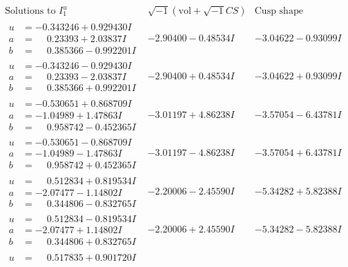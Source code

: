 \documentclass[1p]{elsarticle_modified}
\theoremstyle{definition}
\newcommand{\I}{\sqrt{-1}}
\begin{document}
$$\begin{array}{c|c|c}  
\text{Solutions to }I^u_{1}& \I (\text{vol} + \sqrt{-1}CS) & \text{Cusp shape}\\
 \hline 
\begin{aligned}
u &= -0.343246 + 0.929430 I \\
a &= \phantom{-}0.23393 + 2.03837 I \\
b &= \phantom{-}0.385366 - 0.992201 I\end{aligned}
 & -2.90400 - 0.48534 I & -3.04622 - 0.93099 I \\ \hline\begin{aligned}
u &= -0.343246 - 0.929430 I \\
a &= \phantom{-}0.23393 - 2.03837 I \\
b &= \phantom{-}0.385366 + 0.992201 I\end{aligned}
 & -2.90400 + 0.48534 I & -3.04622 + 0.93099 I \\ \hline\begin{aligned}
u &= -0.530651 + 0.868709 I \\
a &= -1.04989 + 1.47863 I \\
b &= \phantom{-}0.958742 - 0.452365 I\end{aligned}
 & -3.01197 + 4.86238 I & -3.57054 - 6.43781 I \\ \hline\begin{aligned}
u &= -0.530651 - 0.868709 I \\
a &= -1.04989 - 1.47863 I \\
b &= \phantom{-}0.958742 + 0.452365 I\end{aligned}
 & -3.01197 - 4.86238 I & -3.57054 + 6.43781 I \\ \hline\begin{aligned}
u &= \phantom{-}0.512834 + 0.819534 I \\
a &= -2.07477 - 1.14802 I \\
b &= \phantom{-}0.344806 - 0.832765 I\end{aligned}
 & -2.20006 - 2.45590 I & -5.34282 + 5.82388 I \\ \hline\begin{aligned}
u &= \phantom{-}0.512834 - 0.819534 I \\
a &= -2.07477 + 1.14802 I \\
b &= \phantom{-}0.344806 + 0.832765 I\end{aligned}
 & -2.20006 + 2.45590 I & -5.34282 - 5.82388 I \\ \hline\begin{aligned}
u &= \phantom{-}0.517835 + 0.901720 I \\

\end{aligned}
\end{array}$$
\end{document}
